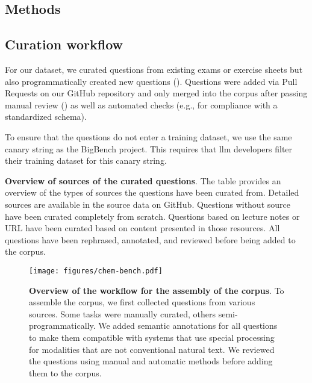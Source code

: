 \documentclass[11pt, oneside]{article}
\begin{document}
\begin{refsection}
\clearpage

\section{Methods}

\subsection{Curation workflow}\label{sec:curation}
For our dataset, we curated questions from existing exams or exercise sheets but also programmatically created new questions ().
Questions were added via Pull Requests on our GitHub repository and only merged into the corpus after passing manual review () as well as automated checks (e.g., for compliance with a standardized schema).

To ensure that the questions do not enter a training dataset, we use the same canary string as the BigBench project.
This requires that \Gls{llm} developers filter their training dataset for this canary string.\autocite{openai2024gpt4, srivastava2022beyond}



\begin{table}[!h]
    \centering
    \caption{\textbf{Overview of sources of the curated questions}. The table provides an overview of the types of sources the questions have been curated from. Detailed sources are available in the source data on GitHub. Questions without source have been curated completely from scratch. Questions based on lecture notes or URL have been curated based on content presented in those resources. All questions have been rephrased, annotated, and reviewed before being added to the corpus.}
    \label{tab:sources}
\end{table}

\begin{figure}[!h]
    \texttt{[image: figures/chem-bench.pdf]}
    \caption{\textbf{Overview of the workflow for the assembly of the \chembench corpus}.
    To assemble the \chembench corpus, we first collected questions from various sources. Some tasks were manually curated, others semi-programmatically. We added semantic annotations for all questions to make them compatible with systems that use special processing for modalities that are not conventional natural text. We reviewed the questions using manual and automatic methods before adding them to the corpus.}
    \label{fig:curation_workflow}
\end{figure}


\end{refsection}
\end{document}
